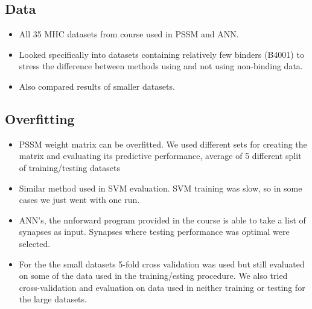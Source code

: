 \documentclass[presentation]{beamer}   %
\begin{document}
\subsection{Data}
\begin{frame}
  \begin{itemize}
    \item<1> All 35 MHC datasets from course used in PSSM and ANN.
    \item<2>  Looked specifically into datasets containing relatively few binders (B4001) to stress the difference between methods using and not using non-binding data.
    \item<3> Also compared results of smaller datasets.
  \end{itemize}
\end{frame}

\subsection{Overfitting}
\begin{frame}
  \begin{itemize}
    \item<1> PSSM weight matrix can be overfitted. We used different sets for creating the matrix and evaluating its predictive performance, average of 5 different split of training/testing datasets
    \item<2> Similar method used in SVM evaluation. SVM training was slow, so in some cases we just went with one run.
    \item<3> ANN's, the nnforward program provided in the course is able to take a list of synapses as input. Synapses where testing performance was optimal were selected.
    \item<4> For the the small datasets 5-fold cross validation was used but still evaluated on some of the data used in the training/esting procedure. We also tried cross-validation and evaluation on data used in neither training or testing for the large datasets.
  \end{itemize}
\end{frame}
\end{document}
